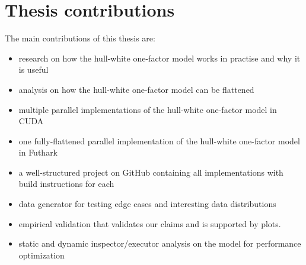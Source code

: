 \section{Thesis contributions}
\label{section:thesiscontributions}
The main contributions of this thesis are: 
\begin{itemize}
    \item research on how the hull-white one-factor model works in practise and why it is useful
    \item analysis on how the hull-white one-factor model can be flattened
    \item multiple parallel implementations of the hull-white one-factor model in CUDA
    \item one fully-flattened parallel implementation of the hull-white one-factor model in Futhark
    \item a well-structured project on GitHub containing all implementations with build instructions for each
    \item data generator for testing edge cases and interesting data distributions
    \item empirical validation that validates our claims and is supported by plots. 
    \item static and dynamic inspector/executor analysis on the model for performance optimization 
\end{itemize}
	
	


